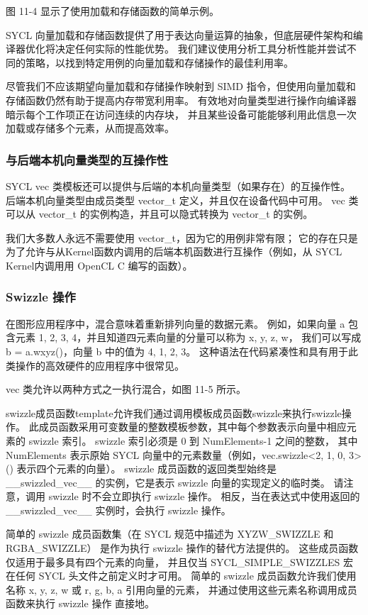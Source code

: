 图 11-4 显示了使用加载和存储函数的简单示例。

SYCL 向量加载和存储函数提供了用于表达向量运算的抽象，但底层硬件架构和编译器优化将决定任何实际的性能优势。 
我们建议使用分析工具分析性能并尝试不同的策略，以找到特定用例的向量加载和存储操作的最佳利用率。

尽管我们不应该期望向量加载和存储操作映射到 SIMD 指令，但使用向量加载和存储函数仍然有助于提高内存带宽利用率。 
有效地对向量类型进行操作向编译器暗示每个工作项正在访问连续的内存块，
并且某些设备可能能够利用此信息一次加载或存储多个元素，从而提高效率。

\subsubsection{与后端本机向量类型的互操作性}
SYCL vec 类模板还可以提供与后端的本机向量类型（如果存在）的互操作性。 
后端本机向量类型由成员类型 vector\_t 定义，并且仅在设备代码中可用。 
vec 类可以从 vector\_t 的实例构造，并且可以隐式转换为 vector\_t 的实例。

我们大多数人永远不需要使用 vector\_t，因为它的用例非常有限； 
它的存在只是为了允许与从Kernel函数内调用的后端本机函数进行互操作（例如，从 SYCL Kernel内调用用 OpenCL C 编写的函数）。

\subsubsection{Swizzle 操作}
在图形应用程序中，混合意味着重新排列向量的数据元素。 
例如，如果向量 a 包含元素 {1, 2, 3, 4}，并且知道四元素向量的分量可以称为 {x, y, z, w}，
我们可以写成 b = a.wxyz()，向量 b 中的值为 {4, 1, 2, 3}。 
这种语法在代码紧凑性和具有用于此类操作的高效硬件的应用程序中很常见。

vec 类允许以两种方式之一执行混合，如图 11-5 所示。

swizzle成员函数template允许我们通过调用模板成员函数swizzle来执行swizzle操作。 
此成员函数采用可变数量的整数模板参数，其中每个参数表示向量中相应元素的 swizzle 索引。 
swizzle 索引必须是 0 到 NumElements-1 之间的整数，
其中 NumElements 表示原始 SYCL 向量中的元素数量（例如，vec.swizzle<2, 1, 0, 3>() 表示四个元素的向量）。 
swizzle 成员函数的返回类型始终是 \_\_swizzled\_vec\_\_ 的实例，它是表示 swizzle 向量的实现定义的临时类。 
请注意，调用 swizzle 时不会立即执行 swizzle 操作。 
相反，当在表达式中使用返回的 \_\_swizzled\_vec\_\_ 实例时，会执行 swizzle 操作。

简单的 swizzle 成员函数集（在 SYCL 规范中描述为 XYZW\_SWIZZLE 和 RGBA\_SWIZZLE）
是作为执行 swizzle 操作的替代方法提供的。 这些成员函数仅适用于最多具有四个元素的向量，
并且仅当 SYCL\_SIMPLE\_SWIZZLES 宏在任何 SYCL 头文件之前定义时才可用。 
简单的 swizzle 成员函数允许我们使用名称 {x, y, z, w} 或 {r, g, b, a} 引用向量的元素，
并通过使用这些元素名称调用成员函数来执行 swizzle 操作 直接地。

